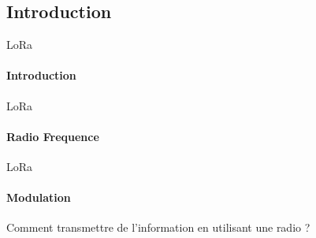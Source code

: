 \subsection{Introduction}

\begin{frame}{LoRa}
\framesubtitle{Introduction}

\end{frame}

\begin{frame}{LoRa}
\framesubtitle{Radio Frequence}
\end{frame}

\begin{frame}{LoRa}
\framesubtitle{Modulation}
\begin{block}{}
{
Comment transmettre de l'information en utilisant une radio ?
}
\end{block}

\end{frame}


